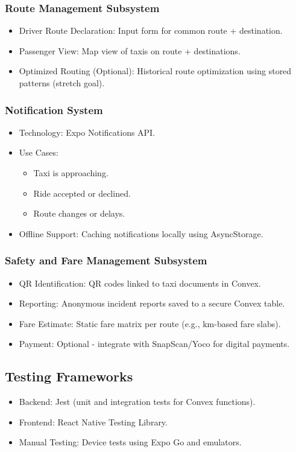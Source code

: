 \documentclass[a4paper,12pt]{article}
\begin{document}
\subsubsection*{Route Management Subsystem}
\begin{itemize}
    \item Driver Route Declaration: Input form for common route + destination.
    \item Passenger View: Map view of taxis on route + destinations.
    \item Optimized Routing (Optional): Historical route optimization using stored patterns (stretch goal).
\end{itemize}

\subsubsection*{Notification System}
\begin{itemize}
    \item Technology: Expo Notifications API.
    \item Use Cases:
    \begin{itemize}
        \item Taxi is approaching.
        \item Ride accepted or declined.
        \item Route changes or delays.
    \end{itemize}
    \item Offline Support: Caching notifications locally using AsyncStorage.
\end{itemize}

\subsubsection*{Safety and Fare Management Subsystem}
\begin{itemize}
    \item QR Identification: QR codes linked to taxi documents in Convex.
    \item Reporting: Anonymous incident reports saved to a secure Convex table.
    \item Fare Estimate: Static fare matrix per route (e.g., km-based fare slabs).
    \item Payment: Optional - integrate with SnapScan/Yoco for digital payments.
\end{itemize}

\subsection{Testing Frameworks}
\begin{itemize}
    \item Backend: Jest (unit and integration tests for Convex functions).
    \item Frontend: React Native Testing Library.
    \item Manual Testing: Device tests using Expo Go and emulators.
\end{itemize}
\end{document}

